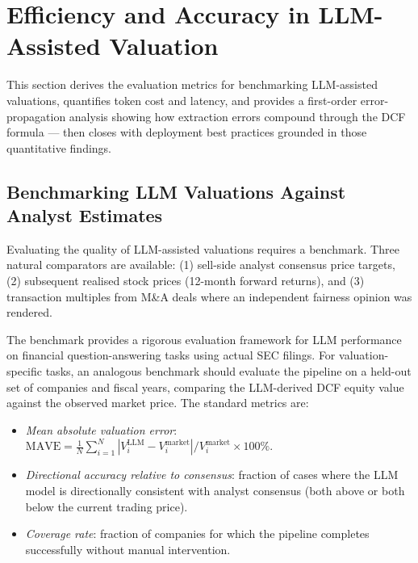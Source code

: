 
\section{Efficiency and Accuracy in LLM-Assisted Valuation}
\label{sec:bv-efficiency}

\begin{deepdive}
This section derives the evaluation metrics for benchmarking LLM-assisted valuations,
quantifies token cost and latency, and provides a first-order error-propagation
analysis showing how extraction errors compound through the DCF formula — then closes
with deployment best practices grounded in those quantitative findings.

\subsection{Benchmarking LLM Valuations Against Analyst Estimates}
\label{subsec:bv-efficiency-benchmarking}

Evaluating the quality of LLM-assisted valuations requires a benchmark. Three
natural comparators are available: (1) sell-side analyst consensus price targets,
(2) subsequent realised stock prices (12-month forward returns), and (3) transaction
multiples from M\&A deals where an independent fairness opinion was rendered.

The \citet{zhang2024financebench} benchmark provides a rigorous evaluation framework
for LLM performance on financial question-answering tasks using actual SEC filings.
For valuation-specific tasks, an analogous benchmark should evaluate the pipeline
on a held-out set of companies and fiscal years, comparing the LLM-derived DCF
equity value against the observed market price. The standard metrics are:

\begin{itemize}
  \item \emph{Mean absolute valuation error}: $\text{MAVE} = \frac{1}{N}\sum_{i=1}^{N} |V_i^{\mathrm{LLM}} - V_i^{\mathrm{market}}| / V_i^{\mathrm{market}} \times 100\%$.
  \item \emph{Directional accuracy relative to consensus}: fraction of cases where the
        LLM model is directionally consistent with analyst consensus (both above or both
        below the current trading price).
  \item \emph{Coverage rate}: fraction of companies for which the pipeline completes
        successfully without manual intervention.
\end{itemize}


\end{deepdive}
